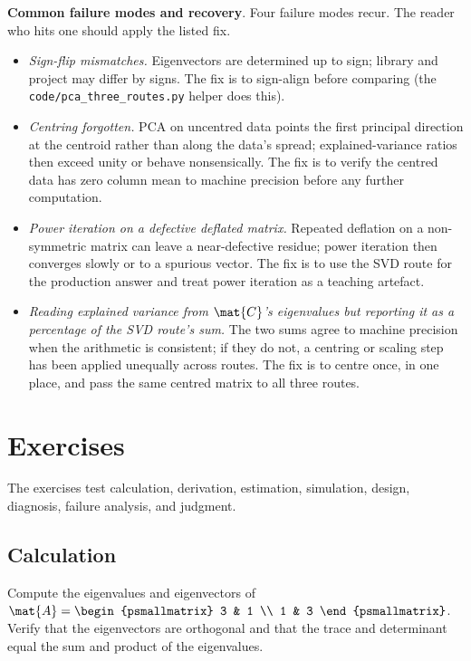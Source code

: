 \begin{project}
\textbf{Common failure modes and recovery}. Four failure modes
recur. The reader who hits one should apply the listed fix.

\begin{itemize}[leftmargin=*]
  \item \textit{Sign-flip mismatches.} Eigenvectors are determined
    up to sign; library and project may differ by signs. The fix
    is to sign-align before comparing (the
    \texttt{code/pca\_three\_routes.py} helper does this).
  \item \textit{Centring forgotten.} PCA on uncentred data points
    the first principal direction at the centroid rather than along
    the data's spread; explained-variance ratios then exceed unity
    or behave nonsensically. The fix is to verify the centred data
    has zero column mean to machine precision before any further
    computation.
  \item \textit{Power iteration on a defective deflated matrix.}
    Repeated deflation on a non-symmetric matrix can leave a
    near-defective residue; power iteration then converges slowly
    or to a spurious vector. The fix is to use the SVD route for
    the production answer and treat power iteration as a teaching
    artefact.
  \item \textit{Reading explained variance from $\mat{C}$'s
    eigenvalues but reporting it as a percentage of the SVD route's
    sum.} The two sums agree to machine precision when the
    arithmetic is consistent; if they do not, a centring or scaling
    step has been applied unequally across routes. The fix is to
    centre once, in one place, and pass the same centred matrix to
    all three routes.
\end{itemize}
\end{project}

\section{Exercises}

The exercises test calculation, derivation, estimation, simulation,
design, diagnosis, failure analysis, and judgment.

\subsection*{Calculation}

\begin{exercise}
Compute the eigenvalues and eigenvectors of $\mat{A} =
\begin{psmallmatrix} 3 & 1 \\ 1 & 3 \end{psmallmatrix}$. Verify
that the eigenvectors are orthogonal and that the trace and
determinant equal the sum and product of the eigenvalues.
\end{exercise}


